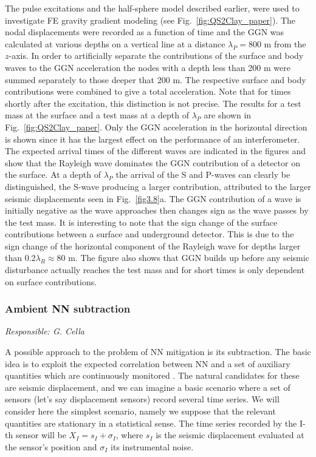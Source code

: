 The pulse excitations and the half-sphere model described earlier, were used to investigate FE gravity gradient modeling (see Fig.~\ref{fig:QS2Clay_paper}). The nodal displacements were recorded as a function of time and the GGN was calculated at various depths on a vertical line at a distance $\lambda_P= 800$ m from the $z$-axis. In order to artificially separate the contributions of the surface and body waves to the GGN acceleration the nodes with a depth less than 200 m were summed separately to those deeper that 200 m. The respective surface and body contributions were combined to give a total acceleration. Note that for times shortly after the excitation, this distinction is not precise. The results for a test mass at the surface and a test mass at a depth of $\lambda_P$ are shown in Fig.~\ref{fig:QS2Clay_paper}. Only the GGN acceleration in the horizontal direction is shown since it has the largest effect on the performance of an interferometer. The expected arrival times of the different waves are indicated in the figures and show that the Rayleigh wave dominates the GGN contribution of a detector on the surface. At a depth of $\lambda_P$ the arrival of the S and P-waves can clearly be distinguished, the S-wave producing a larger contribution, attributed to the larger seismic displacements seen in Fig.~\ref{fig3.8}a. The GGN contribution of a wave is initially negative as the wave approaches then changes sign as the wave passes by the test mass. It is interesting to note that the sign change of the surface contributions between a surface and underground detector. This is due to the sign change of the horizontal component of the Rayleigh wave for depths larger than 0.2$\lambda_R \approx 80$ m. The figure also shows that GGN builds up before any seismic disturbance actually reaches the test mass and for short times is only dependent on surface contributions.
\FloatBarrier
\subsubsection{Ambient NN subtraction}
\label{subsub:AmbientNNsubtraction}

\emph{
Responsible:  G. Cella  \\
}

A possible approach to the problem of NN mitigation is its subtraction. The basic idea is to exploit the expected correlation between NN and a set of auxiliary quantities which are continuously monitored \cite{CatichaPRE}. The natural candidates for these are seismic displacement, and we can imagine a basic scenario where a set of sensors (let's say displacement sensors) record several time series. We will consider here the simplest scenario, namely we suppose that the relevant quantities are stationary in a statistical sense. The time series recorded by the I-th sensor will be $X_I = s_I + \sigma_I$, where $s_I$ is the seismic displacement evaluated at the sensor's position and $\sigma_I$ its instrumental noise.

